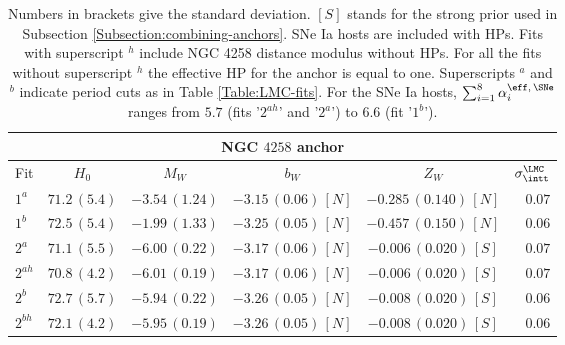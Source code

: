 \begin{table}[tbp]
\centering
\begin{tabular}{@{}lccccr}
\hline
\multicolumn{6}{c}{NGC $4258$ anchor} \\
\hline
Fit & $H_0$ & $M_W$ & $b_W$ & $Z_W$ & $\sigma_{\intt}^{\LMC}$  \\
\hline
$1^a$ & $71.2\,(5.4)$& $-3.54\,(1.24)$ & $-3.15\,(0.06)\,[N]$ & $-0.285\,(0.140)\,[N]$ & $0.07$ \\
  
$1^b$ & $72.5\,(5.4)$& $-1.99\,(1.33)$ & $-3.25\,(0.05)\,[N]$ & $-0.457\,(0.150)\,[N]$ & $ 0.06$\\
   
$2^a$ & $71.1\,(5.5)$& $-6.00\,(0.22)$&$-3.17\,(0.06)\,[N]$ &$-0.006\,(0.020)\,[S]$ & $ 0.07$\\

$2^{ah}$ & $70.8\,(4.2)$& $-6.01\,(0.19)$&$-3.17\,(0.06)\,[N]$ &$-0.006\,(0.020)\,[S]$ & $ 0.07$\\

$2^b$ & $72.7\,(5.7)$& $-5.94\,(0.22)$&$-3.26\,(0.05)\,[N]$ &$-0.008\,(0.020)\,[S]$ & $ 0.06$\\

$2^{bh}$ & $72.1\,(4.2)$& $-5.95\,(0.19)$&$-3.26\,(0.05)\,[N]$ &$-0.008\,(0.020)\,[S]$ & $ 0.06$\\

\hline
\end{tabular}
\caption{\label{Table:NGC4258-fits} Numbers in brackets give the standard deviation. $[S]$ stands for the strong prior used in Subsection \ref{Subsection:combining-anchors}. SNe Ia hosts are included with HPs. Fits with superscript $^h$ include NGC 4258 distance modulus without HPs. For all the fits without superscript $^h$ the effective HP for the anchor is equal to one. Superscripts $^a$ and $^b$ indicate period cuts as in Table \ref{Table:LMC-fits}. For the SNe Ia hosts, $\sum_{i=1}^{8}  \alpha^{\eff,\,\SNe}_{i}$ ranges from $5.7$ (fits '$2^{ah}$' and '$2^a$') to $6.6$ (fit '$1^b$'). }
\end{table}


